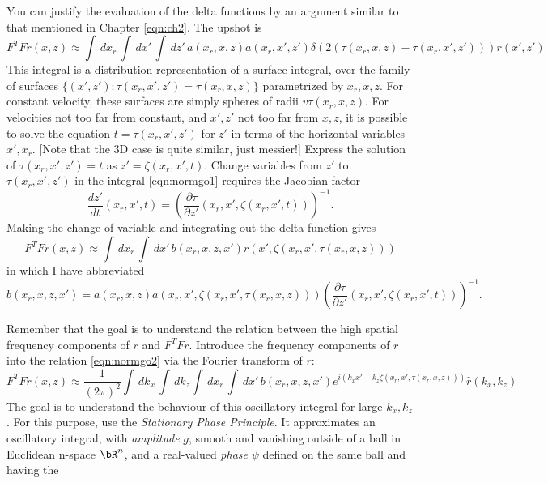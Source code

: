 You can justify the evaluation of the delta functions by an argument similar to that mentioned in Chapter \ref{eqn:ch2}. The upshot is
\begin{equation}
\label{eqn:normgo1}
F^TFr(x,z) \approx \int \, dx_r \, \int \, dx'\,\int\,dz'\, a(x_r,x,z)a(x_r,x',z')\delta(2(\tau(x_r,x,z)-\tau(x_r,x',z')))r(x',z') 
\end{equation}
This integral is a distribution representation of a surface integral, over the family of surfaces 
$\{(x',z'): \tau(x_r,x',z')=\tau(x_r,x,z)\}$ parametrized by $x_r,x,z$. For constant velocity, these surfaces are simply spheres of radii $v\tau(x_r,x,z)$. For velocities not too far from constant, and $x',z'$ not too far from $x,z$, it is possible to solve the equation $t = \tau(x_r,x',z')$ for $z'$ in terms of the horizontal variables $x',x_r$. [Note that the 3D case is quite similar, just messier!] Express the solution of $\tau(x_r,x',z')=t$ as $z' = \zeta(x_r,x',t)$. Change variables from $z'$ to $\tau(x_r,x',z')$ in the integral \ref{eqn:normgo1} requires the Jacobian factor
\[
\frac{dz'}{dt}(x_r,x',t) = \left(\frac{\partial \tau}{\partial  z'}(x_r,x',\zeta(x_r,x',t))\right)^{-1}.
\]
Making the change of variable and integrating out the delta function gives 
\begin{equation}
\label{eqn:normgo2}
F^TFr(x,z) \approx \int \, dx_r \, \int \, dx'\, b(x_r,x,z,x')r(x',\zeta(x_r,x',\tau(x_r,x,z)) )
\end{equation}
in which I have abbreviated
\begin{equation}
\label{eqn:normgoamp}
b(x_r,x,z,x')=a(x_r,x,z)a(x_r,x',\zeta(x_r,x',\tau(x_r,x,z))) \left(\frac{\partial \tau}{\partial z'}(x_r,x',\zeta(x_r,x',t))\right)^{-1}.
\end{equation}

Remember that the goal is to understand the relation between the high spatial frequency components of $r$ and $F^TFr$. Introduce the frequency components of $r$ into the relation \ref{eqn:normgo2} via the Fourier transform of $r$:
\begin{equation}
\label{eqn:normgoft}
F^TFr(x,z) \approx \frac{1}{(2\pi)^2}\int\,dk_x \,\int \, dk_z \int \, dx_r \, \int \, dx'\, b(x_r,x,z,x')e^{i(k_xx'+k_z\zeta(x_r,x',\tau(x_r,x,z)) )}\hat{r}(k_x,k_z) 
\end{equation}
The goal is to understand the behaviour of this oscillatory integral for large $k_x,k_z$. For this purpose, use the {\em Stationary Phase Principle}. It approximates an oscillatory integral, with {\em amplitude} $g$, smooth and vanishing outside of a ball in  Euclidean n-space $\bR^n$, and a real-valued {\em phase} $\psi$ defined on the same ball and having the 

